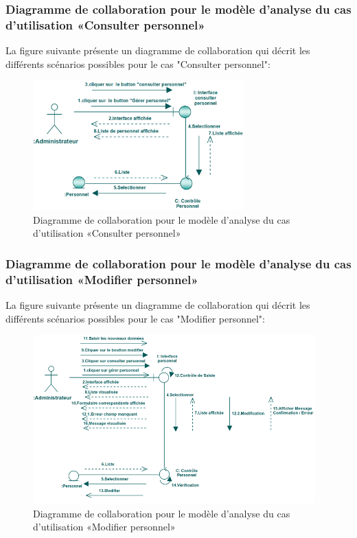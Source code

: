 \documentclass[12 pt]{report}
\begin{document}
\subsubsection{Diagramme de collaboration pour le modèle d’analyse du cas d'utilisation                                       «Consulter personnel»}
La figure suivante présente un diagramme de collaboration qui décrit les différents
scénarios possibles pour le cas "Consulter personnel":
\begin{figure}[h]
 \begin{center}
\includegraphics[width= 14 cm ,height=  5cm]{collaconsper.PNG}
\caption{Diagramme de collaboration pour le modèle d’analyse du cas d'utilisation                                       «Consulter personnel»}

\end{center}
\end{figure}
\subsubsection{Diagramme de collaboration pour le modèle d’analyse du cas d'utilisation                                       «Modifier personnel»}
La figure suivante présente un diagramme de collaboration qui décrit les différents
scénarios possibles pour le cas "Modifier personnel":
\begin{figure}[h]
 \begin{center}
\includegraphics[width= 14 cm ,height=  6.5cm]{colla_adm_modifierpersonnel.PNG}
\caption{Diagramme de collaboration pour le modèle d’analyse du cas d'utilisation                                       «Modifier personnel»}

\end{center}
\end{figure}
\end{document}
